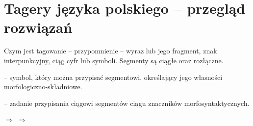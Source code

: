 \documentclass[xcolor=dvipsnames,polish]{beamer}
\begin{document}
\section{Tagery języka polskiego -- przegląd rozwiązań}
\frame{\sectionpage}

\begin{frame}{Czym jest tagowanie -- przypomnienie}
   -- wyraz lub jego fragment, znak interpunkcyjny, ciąg cyfr
lub symboli. Segmenty są ciągłe oraz rozłączne.
  \vspace{0.5cm}

   -- symbol, który można przypisać segmentowi, określający jego własności morfologiczno-składniowe.
  \vspace{0.5cm}

   -- zadanie przypisania ciągowi segmentów ciągu znaczników morfosyntaktycznych.
  \vspace{1cm}

   $\Rightarrow$  $\Rightarrow$ 
\end{frame}
\end{document}

